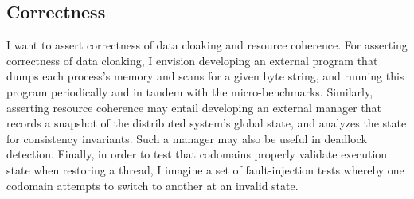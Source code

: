 \subsection{Correctness}

I want to assert correctness of data cloaking and resource coherence.
%
For asserting correctness of data cloaking, I envision developing an external
program that dumps each process's memory and scans for a given byte string,
and running this program periodically and in tandem with the micro-benchmarks.
%
Similarly, asserting resource coherence may entail developing an external
manager that records a snapshot of the distributed system's global state, and
analyzes the state for consistency invariants.
%
Such a manager may also be useful in deadlock detection.
%
Finally, in order to test that codomains properly validate execution state when
restoring a thread, I imagine a set of fault-injection tests whereby one
codomain attempts to switch to another at an invalid state.
